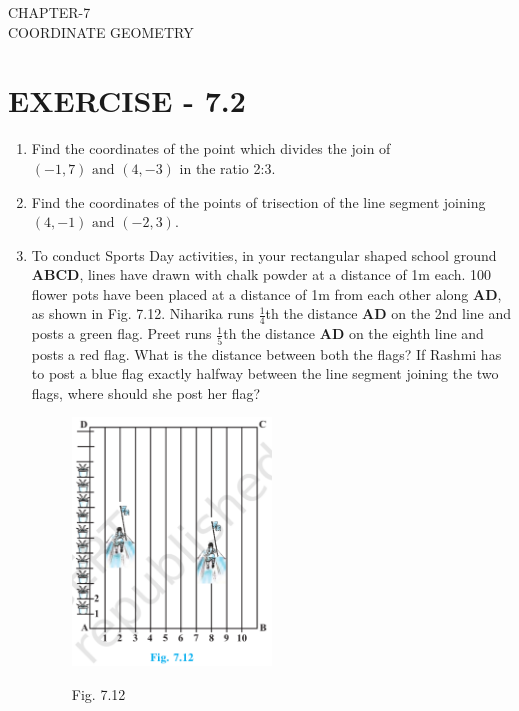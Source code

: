\documentclass[12pt]{article}
\let\vec\mathbf
\begin{document}
\begin{center}
\textbf\large{CHAPTER-7 \\ COORDINATE GEOMETRY}
\end{center}

\section*{EXERCISE - 7.2}
\begin{enumerate}

\item Find the coordinates of the point which divides the join of $(-1,7) \text{ and } (4,-3)$ in the ratio 2:3.
\item Find the coordinates of the points of trisection of the line segment joining $(4,-1) \text{ and } (-2,3).$

\item To conduct Sports Day activities, in your rectangular shaped school                   
ground $\vec{ABCD}$, lines have 
drawn with chalk powder at a                 
distance of 1m each. 100 flower pots have been placed at a distance of 1m 
from each other along $\vec{AD}$, as shown 
in Fig. 7.12. Niharika runs \(\displaystyle \frac{1}{4}\)th the 
distance $\vec{AD}$ on the 2nd line and 
posts a green flag. Preet runs \(\displaystyle \frac{1}{5}\)th 
the distance $\vec{AD}$ on the eighth line 
and posts a red flag. What is the 
distance between both the flags? If 
Rashmi has to post a blue flag exactly 
halfway between the line segment 
joining the two flags, where should 
she post her flag?\begin{figure}[h!]
 
  \centering
  \includegraphics[width=0.5\textwidth]{sc}
  \begin{center}
  Fig. 7.12
  \end{center}
\end{figure}                     


\end{enumerate}
\end{document}
